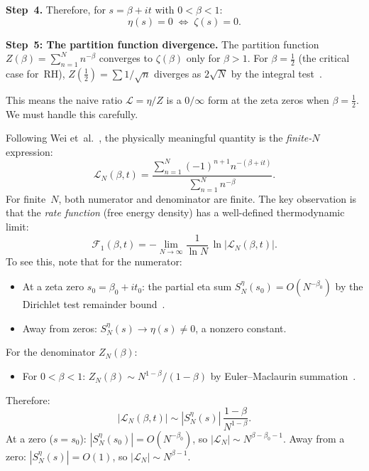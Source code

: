 \medskip\noindent
\textbf{Step~4.} Therefore, for $s = \beta + it$ with $0 < \beta < 1$:
\begin{equation}\label{eq:eta-zero-equiv}
  \eta(s) = 0 \;\Longleftrightarrow\; \zeta(s) = 0.
\end{equation}

\medskip\noindent
\textbf{Step~5: The partition function divergence.}
The partition function $Z(\beta) = \sum_{n=1}^{N} n^{-\beta}$ converges to
$\zeta(\beta)$ only for $\beta > 1$. For $\beta = \tfrac{1}{2}$ (the critical case
for~RH), $Z(\tfrac{1}{2}) = \sum 1/\sqrt{n}$ diverges as $2\sqrt{N}$ by the integral
test~\cite{titchmarsh1986}.

This means the naive ratio $\mathcal{L} = \eta / Z$ is a $0/\infty$ form at the zeta
zeros when $\beta = \tfrac{1}{2}$. We must handle this carefully.

Following Wei et~al.~\cite{wei2025}, the physically meaningful quantity is the
\emph{finite-$N$} expression:
\begin{equation}\label{eq:LN-def}
  \mathcal{L}_N(\beta,t) = \frac{\sum_{n=1}^{N}(-1)^{n+1}n^{-(\beta+it)}}
  {\sum_{n=1}^{N} n^{-\beta}}.
\end{equation}
For finite~$N$, both numerator and denominator are finite. The key observation is that
the \emph{rate function} (free energy density) has a well-defined thermodynamic limit:
\begin{equation}\label{eq:F1-def}
  \mathcal{F}_1(\beta,t) = -\lim_{N\to\infty} \frac{1}{\ln N}\,
  \ln|\mathcal{L}_N(\beta,t)|.
\end{equation}
To see this, note that for the numerator:
\begin{itemize}
  \item At a zeta zero $s_0 = \beta_0 + it_0$: the partial eta sum
    $S_N^{\eta}(s_0) = O(N^{-\beta_0})$ by the Dirichlet test remainder
    bound~\cite{titchmarsh1986}.
  \item Away from zeros: $S_N^{\eta}(s) \to \eta(s) \ne 0$, a nonzero constant.
\end{itemize}
For the denominator $Z_N(\beta)$:
\begin{itemize}
  \item For $0 < \beta < 1$: $Z_N(\beta) \sim N^{1-\beta}/(1-\beta)$ by
    Euler--Maclaurin summation~\cite{titchmarsh1986}.
\end{itemize}
Therefore:
\begin{equation}\label{eq:LN-scaling}
  |\mathcal{L}_N(\beta,t)| \sim |S_N^{\eta}(s)|\,\frac{1-\beta}{N^{1-\beta}}.
\end{equation}
At a zero ($s = s_0$): $|S_N^{\eta}(s_0)| = O(N^{-\beta_0})$, so
$|\mathcal{L}_N| \sim N^{\beta-\beta_0-1}$.
Away from a zero: $|S_N^{\eta}(s)| = O(1)$, so $|\mathcal{L}_N| \sim N^{\beta-1}$.

